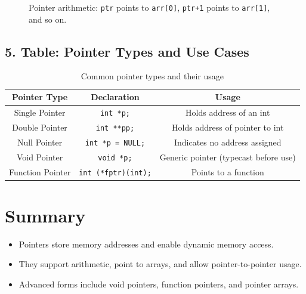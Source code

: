\begin{figure}[H]
\centering
{}
\caption{Pointer arithmetic: \texttt{ptr} points to \texttt{arr[0]}, \texttt{ptr+1} points to \texttt{arr[1]}, and so on.}
\end{figure}

\subsection*{\large \textbf{5. Table: Pointer Types and Use Cases}}

\begin{table}[H]
\centering
\begin{tabular}{|c|c|c|}
\hline
\textbf{Pointer Type} & \textbf{Declaration} & \textbf{Usage} \\
\hline
Single Pointer & \texttt{int *p;} & Holds address of an int \\
\hline
Double Pointer & \texttt{int **pp;} & Holds address of pointer to int \\
\hline
Null Pointer & \texttt{int *p = NULL;} & Indicates no address assigned \\
\hline
Void Pointer & \texttt{void *p;} & Generic pointer (typecast before use) \\
\hline
Function Pointer & \texttt{int (*fptr)(int);} & Points to a function \\
\hline
\end{tabular}
\caption{Common pointer types and their usage}
\end{table}

\section*{\Large \textbf{Summary}}
\begin{itemize}
  \item Pointers store memory addresses and enable dynamic memory access.
  \item They support arithmetic, point to arrays, and allow pointer-to-pointer usage.
  \item Advanced forms include void pointers, function pointers, and pointer arrays.
\end{itemize}